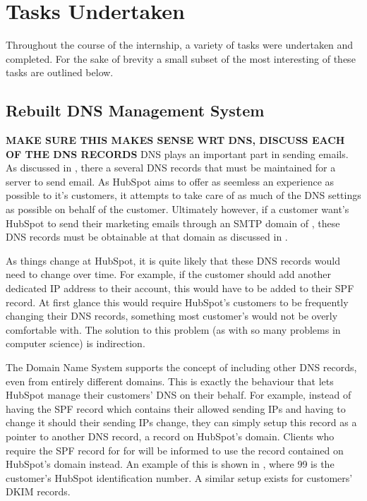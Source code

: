 \chapter{Tasks Undertaken}
Throughout the course of the internship, a variety of tasks were undertaken and completed.  
For the sake of brevity a small subset of the most interesting of these tasks are outlined below. 

\section{Rebuilt DNS Management System}
\textbf{MAKE SURE THIS MAKES SENSE WRT DNS, DISCUSS EACH OF THE DNS RECORDS}\hfill\break
DNS plays an important part in sending emails. As discussed in , there a several DNS records that must be maintained for a server to send email. As HubSpot aims to offer as seemless an experience as possible to it's customers, it attempts to take care of as much of the DNS settings as possible on behalf of the customer. Ultimately however, if a customer want's HubSpot to send their marketing emails through an SMTP domain of , these DNS records must be obtainable at that domain as discussed in . 

As things change at HubSpot, it is quite likely that these DNS records would need to change over time. For example, if the customer should add another dedicated IP address to their account, this would have to be added to their SPF record. At first glance this would require HubSpot's customers to be frequently changing their DNS records, something most customer's would not be overly comfortable with. The solution to this problem (as with so many problems in computer science) is indirection. 

The Domain Name System supports the concept of including other DNS records, even from entirely different domains. This is exactly the behaviour that lets HubSpot manage their customers' DNS on their behalf. For example, instead of  having the SPF record which contains their allowed sending IPs and having to change it should their sending IPs change, they can simply setup this record as a pointer to another DNS record, a record on HubSpot's domain. Clients who require the SPF record for for  will be informed to use the record contained on HubSpot's domain instead. An example of this is shown in , where 99 is the customer's HubSpot identification number. A similar setup exists for customers' DKIM records.

